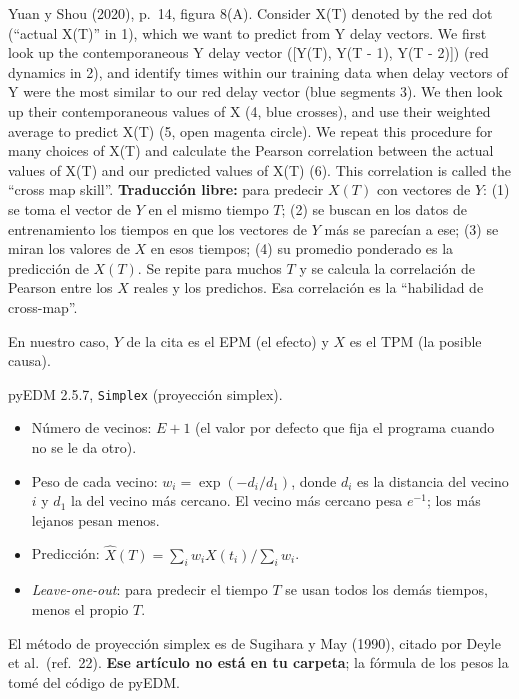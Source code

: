 \documentclass[11pt,openany]{book}
\begin{document}
\begin{cita}{Yuan y Shou (2020), p.~14, figura 8(A).}
Consider X(T) denoted by the red dot (“actual X(T)” in 1), which we want to predict from Y delay vectors. We first look up the contemporaneous Y delay vector ([Y(T), Y(T - 1), Y(T - 2)]) (red dynamics in 2), and identify times within our training data when delay vectors of Y were the most similar to our red delay vector (blue segments 3). We then look up their contemporaneous values of X (4, blue crosses), and use their weighted average to predict X(T) (5, open magenta circle). We repeat this procedure for many choices of X(T) and calculate the Pearson correlation between the actual values of X(T) and our predicted values of X(T) (6). This correlation is called the “cross map skill”.
\tcblower
\textbf{Traducción libre:} para predecir $X(T)$ con vectores de $Y$: (1) se toma el vector de $Y$ en el mismo tiempo $T$; (2) se buscan en los datos de entrenamiento los tiempos en que los vectores de $Y$ más se parecían a ese; (3) se miran los valores de $X$ en esos tiempos; (4) su promedio ponderado es la predicción de $X(T)$. Se repite para muchos $T$ y se calcula la correlación de Pearson entre los $X$ reales y los predichos. Esa correlación es la ``habilidad de cross-map''.
\end{cita}

En nuestro caso, $Y$ de la cita es el EPM (el efecto) y $X$ es el TPM (la posible causa).

\begin{codigo}{pyEDM 2.5.7, \texttt{Simplex} (proyección simplex).}
\begin{itemize}
\item Número de vecinos: $E+1$ (el valor por defecto que fija el programa cuando no se le da otro).
\item Peso de cada vecino: $w_i = \exp(-d_i/d_1)$, donde $d_i$ es la distancia del vecino $i$ y $d_1$ la del vecino más cercano. El vecino más cercano pesa $e^{-1}$; los más lejanos pesan menos.
\item Predicción: $\hat X(T) = \sum_i w_i X(t_i) \big/ \sum_i w_i$.
\item \emph{Leave-one-out}: para predecir el tiempo $T$ se usan todos los demás tiempos, menos el propio $T$.
\end{itemize}
El método de proyección simplex es de Sugihara y May (1990), citado por Deyle et al.\ (ref.~22). \textbf{Ese artículo no está en tu carpeta}; la fórmula de los pesos la tomé del código de pyEDM.
\end{codigo}
\end{document}
